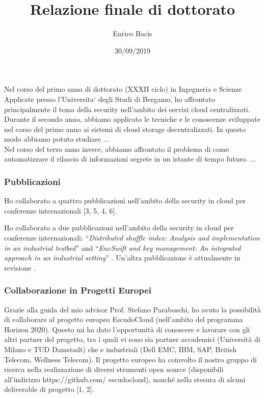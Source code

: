 \documentclass{article}
\begin{document}
\title{Relazione finale di dottorato}
\author{Enrico Bacis}
\date{30/09/2019}

\maketitle

\vspace{40px}

Nel corso del primo anno di dottorato (XXXII ciclo) in Ingegneria e Scienze Applicate presso l’Universita` degli Studi di Bergamo, ho affrontato principalmente il tema della security nell’ambito dei servizi cloud centralizzati.
\\

Durante il secondo anno, abbiamo applicato le tecniche e le conoscenze sviluppate nel corso del primo anno ai sistemi di cloud storage decentralizzati. In questo modo abbiamo potuto studiare ...
\\

Nel corso del terzo anno invece, abbiamo affrontato il problema di come automatizzare il rilascio di informazioni segrete in un istante di tempo futuro. ...

\subsubsection*{Pubblicazioni}

Ho collaborato a quattro pubblicazioni nell’ambito della security in cloud per conferenze internazionali [3, 5, 4, 6].

Ho collaborato a due pubblicazioni nell'ambito della security in cloud per conferenze internazionali: ``{\em Distributed shuffle index: Analysis and implementation in an industrial testbed}'' \cite{8228695} and ``{\em EncSwift and key management: An integrated approach in an industrial setting}'' \cite{8228711}. Un'altra pubblicazione è attualmente in revisione \cite{dcs}.
\\

\subsubsection*{Collaborazione in Progetti Europei}

Grazie alla guida del mio advisor Prof. Stefano Paraboschi, ho avuto la possibilità di collaborare al progetto europeo EscudoCloud (nell’ambito del programma Horizon 2020). Questo mi ha dato l’opportunità di conoscere e lavorare con gli altri partner del progetto, tra i quali vi sono sia partner accademici (Università di Milano e TUD Damstadt) che e industriali (Dell EMC, IBM, SAP, British Telecom, Wellness Telecom).
Il progetto europeo ha coinvolto il nostro gruppo di ricerca nella realizzazione di diversi strumenti open source (disponibili all’indirizzo https://github.com/ escudocloud), nonché nella stesura di alcuni deliverable di progetto [1, 2].
\end{document}
